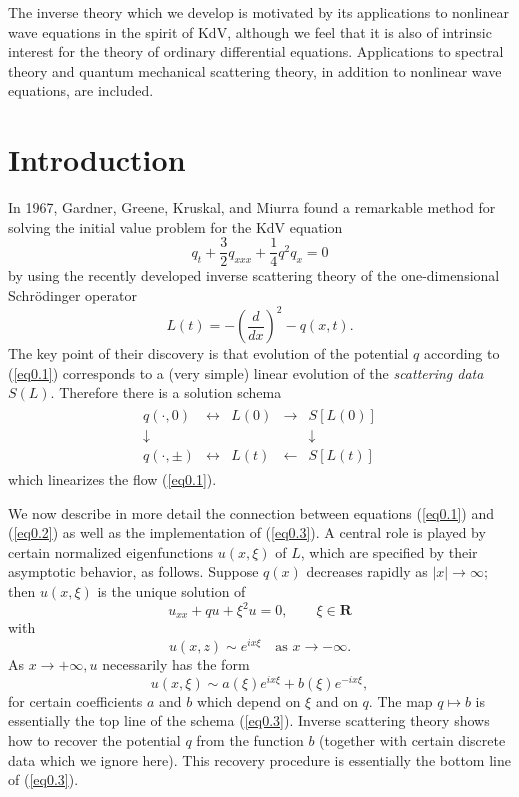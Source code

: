 \documentclass{surv-l}
\theoremstyle{plain}
\theoremstyle{definition}
\numberwithin{equation}{chapter}
\begin{document}
The inverse theory which we develop is motivated by its applications to nonlinear wave equations in the spirit of KdV, although we feel that it is also of intrinsic interest for the theory of ordinary differential equations. Applications to spectral theory and quantum mechanical scattering theory, in addition to nonlinear wave equations, are included.

\mainmatter
\chapter*{Introduction}

In 1967, Gardner, Greene, Kruskal, and Miurra \cite{GGKM} found a remarkable method for solving the initial value problem for the KdV equation
\begin{equation}\label{eq0.1}
q_{t}+\frac{3}{2}q_{xxx}+\frac{1}{4}q^{2}q_{x}=0
\end{equation}
by using the recently developed inverse scattering theory of the one-dimensional Schr\"{o}dinger operator
\begin{equation}\label{eq0.2}
L(t)=-\left(\frac{d}{dx}\right)^{2}-q(x,t).
\end{equation}
The key point of their discovery is that evolution of the potential $q$ according to (\ref{eq0.1}) corresponds to a (very simple) linear evolution of the \emph{scattering data} $S(L)$. Therefore there is a solution schema
\begin{align}\label{eq0.3}
  \begin{array}{ccccc}
    q(\cdot, 0) & \leftrightarrow & L(0) & \rightarrow & S[L(0)] \\
    \downarrow &  &  &  & \downarrow \\
    q(\cdot, \pm) & \leftrightarrow & L(t) & \leftarrow & S[L(t)]
  \end{array}
\end{align}
which linearizes the flow (\ref{eq0.1}).

We now describe in more detail the connection between equations (\ref{eq0.1}) and (\ref{eq0.2}) as well as the implementation of (\ref{eq0.3}). A central role is played by certain normalized eigenfunctions $u(x, \xi)$ of $L$, which are specified by their asymptotic behavior, as follows. Suppose $q(x)$ decreases rapidly as $|x|\rightarrow\infty$; then $u(x, \xi)$ is the unique solution of
\begin{equation}\label{eq0.4}
u_{xx}+qu+\xi^{2}u=0,\qquad \xi\in \textbf{R}
\end{equation}
with
\begin{equation*}
u(x,z)\sim e^{i x\xi}\quad \text{as }  x\rightarrow-\infty.
\end{equation*}
As $x\rightarrow+\infty, u$ necessarily has the form
\begin{equation}\label{eq0.5}
u(x, \xi)\sim a(\xi)e^{ix\xi}+b(\xi)e^{-ix\xi},
\end{equation}
for certain coefficients $a$ and $b$ which depend on $\xi$ and on $q$. The map $q\mapsto b$ is essentially the top line of the schema (\ref{eq0.3}). Inverse scattering theory shows how to recover the potential $q$ from the function $b$ (together with certain discrete data which we ignore here). This recovery procedure is essentially the bottom line of (\ref{eq0.3}).
\end{document}
